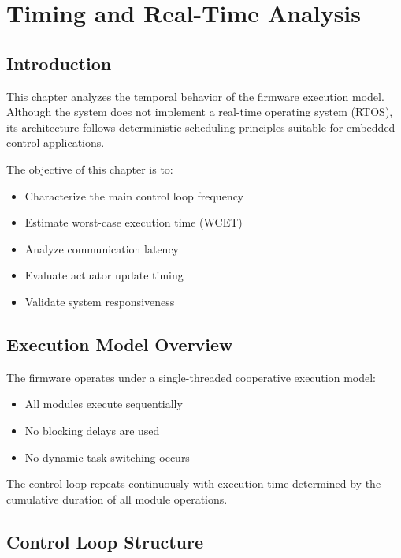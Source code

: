 \chapter{Timing and Real-Time Analysis}

\section{Introduction}

This chapter analyzes the temporal behavior of the firmware execution model. 
Although the system does not implement a real-time operating system (RTOS), 
its architecture follows deterministic scheduling principles suitable for embedded control applications.

The objective of this chapter is to:

\begin{itemize}
	\item Characterize the main control loop frequency
	\item Estimate worst-case execution time (WCET)
	\item Analyze communication latency
	\item Evaluate actuator update timing
	\item Validate system responsiveness
\end{itemize}


\section{Execution Model Overview}

The firmware operates under a single-threaded cooperative execution model:

\begin{itemize}
	\item All modules execute sequentially
	\item No blocking delays are used
	\item No dynamic task switching occurs
\end{itemize}

The control loop repeats continuously with execution time determined by the cumulative duration of all module operations.


\section{Control Loop Structure}

